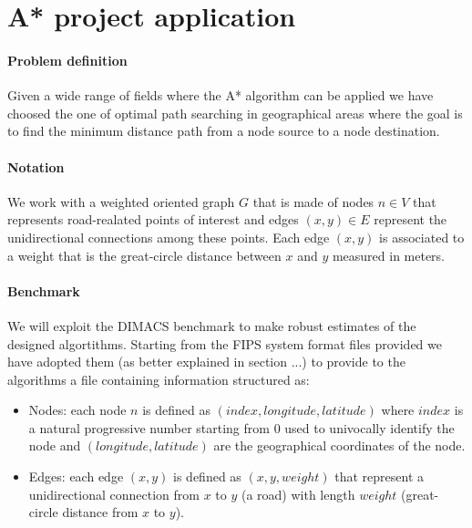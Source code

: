 \documentclass[twocolumn, switch]{article} %
\begin{document}
\section{A* project application}
\paragraph{Problem definition} Given a wide range of fields where the A* algorithm can be applied we have choosed the one of
optimal path searching in geographical areas where the goal is to find the minimum distance path from a 
node source to a node destination.

\paragraph{Notation} We work with a weighted oriented graph $G$ that is made of nodes $n \in V$ that represents
road-realated points of interest and edges $(x,y) \in E$ represent the unidirectional connections among these points.
Each edge $(x, y)$ is associated to a weight that is the great-circle distance between $x$ and $y$ measured
in meters.
\paragraph{Benchmark} We will exploit the DIMACS benchmark to make robust estimates of the designed algortithms.
Starting from the FIPS system format files provided we have adopted them (as better explained in section ...) to provide
to the algorithms a file containing information structured as:
\begin{itemize}
  \item Nodes: each node $n$ is defined as $(index, longitude, latitude)$ where $index$ is a natural progressive
        number starting from $0$ used to univocally identify the node and $(longitude, latitude)$ are the geographical
        coordinates of the node.
  \item Edges: each edge $(x, y)$ is defined as $(x, y, weight)$ that represent a unidirectional connection
        from $x$ to $y$ (a road) with length $weight$ (great-circle distance from $x$ to $y$).
\end{itemize}
\end{document}
